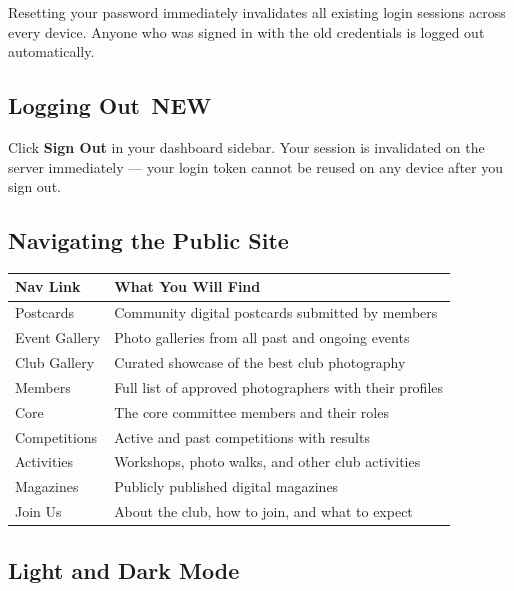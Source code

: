 \documentclass[12pt,a4paper]{article}
\newcommand{\newbadge}{%
  \colorbox{NewFrame}{\color{white}\,\textbf{\footnotesize NEW}\,}%
}
\begin{document}
\begin{notebox}
Resetting your password immediately invalidates all existing login sessions across every device. Anyone who was signed in with the old credentials is logged out automatically.
\end{notebox}

\subsection{Logging Out \newbadge}

Click \textbf{Sign Out} in your dashboard sidebar. Your session is invalidated on the server immediately --- your login token cannot be reused on any device after you sign out.

\subsection{Navigating the Public Site}

\begin{center}
\renewcommand{\arraystretch}{1.3}
\begin{tabularx}{\linewidth}{L{3.2cm} X}
\toprule
\textbf{Nav Link} & \textbf{What You Will Find} \\
\midrule
Postcards & Community digital postcards submitted by members \\
Event Gallery & Photo galleries from all past and ongoing events \\
Club Gallery & Curated showcase of the best club photography \\
Members & Full list of approved photographers with their profiles \\
Core & The core committee members and their roles \\
Competitions & Active and past competitions with results \\
Activities & Workshops, photo walks, and other club activities \\
Magazines & Publicly published digital magazines \\
Join Us & About the club, how to join, and what to expect \\
\bottomrule
\end{tabularx}
\end{center}

\subsection{Light and Dark Mode}
\end{document}
